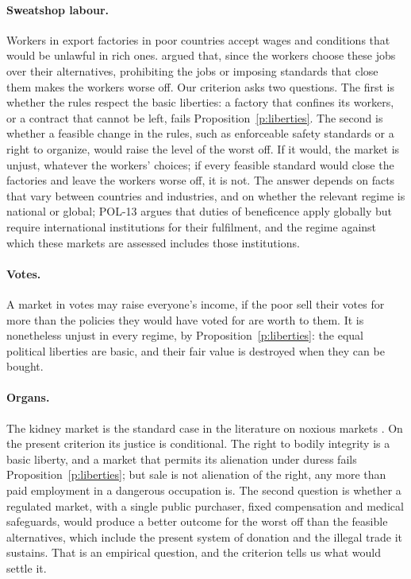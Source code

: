 \documentclass{situationist-preprint}
\begin{document}
\paragraph{Sweatshop labour.} Workers in export factories in poor countries accept wages and conditions that would be unlawful in rich ones. \citet{Zwolinski2007} argued that, since the workers choose these jobs over their alternatives, prohibiting the jobs or imposing standards that close them makes the workers worse off. Our criterion asks two questions. The first is whether the rules respect the basic liberties: a factory that confines its workers, or a contract that cannot be left, fails Proposition~\ref{p:liberties}. The second is whether a feasible change in the rules, such as enforceable safety standards or a right to organize, would raise the level of the worst off. If it would, the market is unjust, whatever the workers' choices; if every feasible standard would close the factories and leave the workers worse off, it is not. The answer depends on facts that vary between countries and industries, and on whether the relevant regime is national or global; POL-13 argues that duties of beneficence apply globally but require international institutions for their fulfilment, and the regime against which these markets are assessed includes those institutions.

\paragraph{Votes.} A market in votes may raise everyone's income, if the poor sell their votes for more than the policies they would have voted for are worth to them. It is nonetheless unjust in every regime, by Proposition~\ref{p:liberties}: the equal political liberties are basic, and their fair value is destroyed when they can be bought.

\paragraph{Organs.} The kidney market is the standard case in the literature on noxious markets \citep{Satz2010}. On the present criterion its justice is conditional. The right to bodily integrity is a basic liberty, and a market that permits its alienation under duress fails Proposition~\ref{p:liberties}; but sale is not alienation of the right, any more than paid employment in a dangerous occupation is. The second question is whether a regulated market, with a single public purchaser, fixed compensation and medical safeguards, would produce a better outcome for the worst off than the feasible alternatives, which include the present system of donation and the illegal trade it sustains. That is an empirical question, and the criterion tells us what would settle it.
\end{document}
